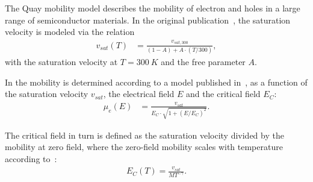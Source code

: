 The Quay mobility model describes the mobility of electron and holes in a large range of semiconductor materials.
In the original publication~\cite{quay}, the saturation velocity is modeled via the relation
\begin{align}
  \label{eq:mob:quay_vs}
  v_{sat}\left(T\right) &= \frac{v_{sat,300}}{(1-A) + A\cdot\left( T/300 \right)} ,
\end{align}
with the saturation velocity at $T=\SI{300}{K}$ and the free parameter $A$.

In \apsq  the mobility is determined according to a model published in~\cite{omar}, as a function of the saturation velocity $v_{sat}$, the electrical field $E$ and the critical field $E_C$:
\begin{align}
  \label{eq:mob:quay_mob}
  \mu_e\left(E\right) &= \frac{v_{sat}}{E_C \cdot \sqrt{ 1 + \left( E/E_C \right)^2 }} .
\end{align}

The critical field in turn is defined as the saturation velocity divided by the mobility at zero field, where the zero-field mobility scales with temperature according to~\cite{omar}:
\begin{align}
  \label{eq:mob:ec}
  E_C(T) = \frac{v_{sat}}{M T^{-\gamma}} .
\end{align}


